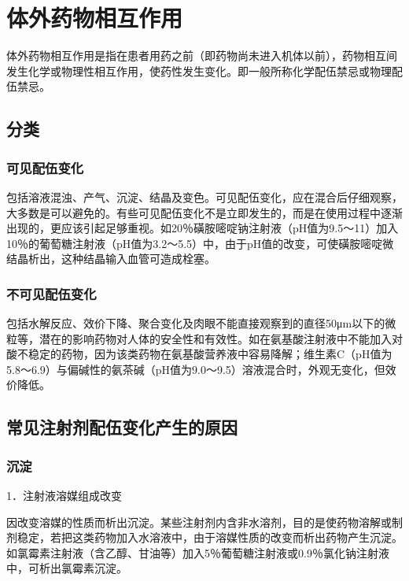 \section{体外药物相互作用}

体外药物相互作用是指在患者用药之前（即药物尚未进入机体以前），药物相互间发生化学或物理性相互作用，使药性发生变化。即一般所称化学配伍禁忌或物理配伍禁忌。

\subsection{分类}

\subsubsection{可见配伍变化}

包括溶液混浊、产气、沉淀、结晶及变色。可见配伍变化，应在混合后仔细观察，大多数是可以避免的。有些可见配伍变化不是立即发生的，而是在使用过程中逐渐出现的，更应该引起足够重视。如20％磺胺嘧啶钠注射液（pH值为9.5～11）加入10％的葡萄糖注射液（pH值为3.2～5.5）中，由于pH值的改变，可使磺胺嘧啶微结晶析出，这种结晶输入血管可造成栓塞。

\subsubsection{不可见配伍变化}

包括水解反应、效价下降、聚合变化及肉眼不能直接观察到的直径50μm以下的微粒等，潜在的影响药物对人体的安全性和有效性。如在氨基酸注射液中不能加入对酸不稳定的药物，因为该类药物在氨基酸营养液中容易降解；维生素C（pH值为5.8～6.9）与偏碱性的氨茶碱（pH值为9.0～9.5）溶液混合时，外观无变化，但效价降低。

\subsection{常见注射剂配伍变化产生的原因}

\subsubsection{沉淀}

1．注射液溶媒组成改变

因改变溶媒的性质而析出沉淀。某些注射剂内含非水溶剂，目的是使药物溶解或制剂稳定，若把这类药物加入水溶液中，由于溶媒性质的改变而析出药物产生沉淀。如氯霉素注射液（含乙醇、甘油等）加入5％葡萄糖注射液或0.9％氯化钠注射液中，可析出氯霉素沉淀。

